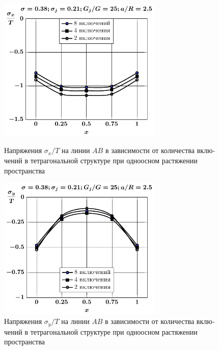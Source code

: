 \begin{russian}
\begin{figure}[h!]
\centering\footnotesize
\parbox[b]{7.5cm}{\centering\includegraphics[width=7.8cm]{inc8-4-2-a25-d95-g25-sig_x-spheres-tension1.pdf}
\caption{Напряжения $\sigma_x/T$ на линии  $AB$ в зависимости от количества включений в тетрагональной структуре при одноосном растяжении пространства
\label{f:8:18}}}\hfil\hfil
\parbox[b]{7.5cm}{\centering\includegraphics[width=7.8cm]{inc8-4-2-a25-d95-g25-sig_y-spheres-tension1.pdf}
\caption{Напряжения $\sigma_y/T$ на линии  $AB$ в зависимости от количества включений в тетрагональной структуре при одноосном растяжении пространства
\label{f:8:19}}}
\end{figure}

%


\end{russian}
